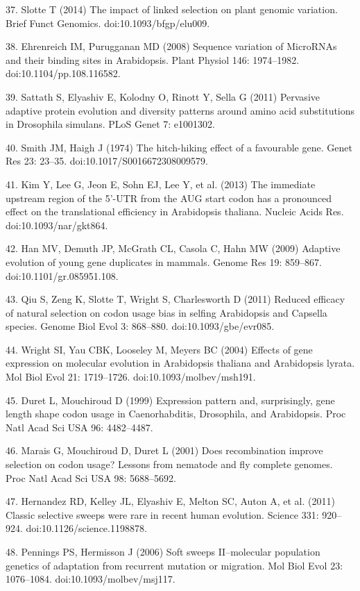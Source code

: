 37.	Slotte T (2014) The impact of linked selection on plant genomic variation. Brief Funct Genomics. doi:10.1093/bfgp/elu009.

38.	Ehrenreich IM, Purugganan MD (2008) Sequence variation of MicroRNAs and their binding sites in Arabidopsis. Plant Physiol 146: 1974–1982. doi:10.1104/pp.108.116582.

39.	Sattath S, Elyashiv E, Kolodny O, Rinott Y, Sella G (2011) Pervasive adaptive protein evolution and diversity patterns around amino acid substitutions in Drosophila simulans. PLoS Genet 7: e1001302. 

40.	Smith JM, Haigh J (1974) The hitch-hiking effect of a favourable gene. Genet Res 23: 23–35. doi:10.1017/S0016672308009579.

41.	Kim Y, Lee G, Jeon E, Sohn EJ, Lee Y, et al. (2013) The immediate upstream region of the 5'-UTR from the AUG start codon has a pronounced effect on the translational efficiency in Arabidopsis thaliana. Nucleic Acids Res. doi:10.1093/nar/gkt864.

42.	Han MV, Demuth JP, McGrath CL, Casola C, Hahn MW (2009) Adaptive evolution of young gene duplicates in mammals. Genome Res 19: 859–867. doi:10.1101/gr.085951.108.

43.	Qiu S, Zeng K, Slotte T, Wright S, Charlesworth D (2011) Reduced efficacy of natural selection on codon usage bias in selfing Arabidopsis and Capsella species. Genome Biol Evol 3: 868–880. doi:10.1093/gbe/evr085.

44.	Wright SI, Yau CBK, Looseley M, Meyers BC (2004) Effects of gene expression on molecular evolution in Arabidopsis thaliana and Arabidopsis lyrata. Mol Biol Evol 21: 1719–1726. doi:10.1093/molbev/msh191.

45.	Duret L, Mouchiroud D (1999) Expression pattern and, surprisingly, gene length shape codon usage in Caenorhabditis, Drosophila, and Arabidopsis. Proc Natl Acad Sci USA 96: 4482–4487.

46.	Marais G, Mouchiroud D, Duret L (2001) Does recombination improve selection on codon usage? Lessons from nematode and fly complete genomes. Proc Natl Acad Sci USA 98: 5688–5692.

47.	Hernandez RD, Kelley JL, Elyashiv E, Melton SC, Auton A, et al. (2011) Classic selective sweeps were rare in recent human evolution. Science 331: 920–924. doi:10.1126/science.1198878.

48.	Pennings PS, Hermisson J (2006) Soft sweeps II--molecular population genetics of adaptation from recurrent mutation or migration. Mol Biol Evol 23: 1076–1084. doi:10.1093/molbev/msj117.

